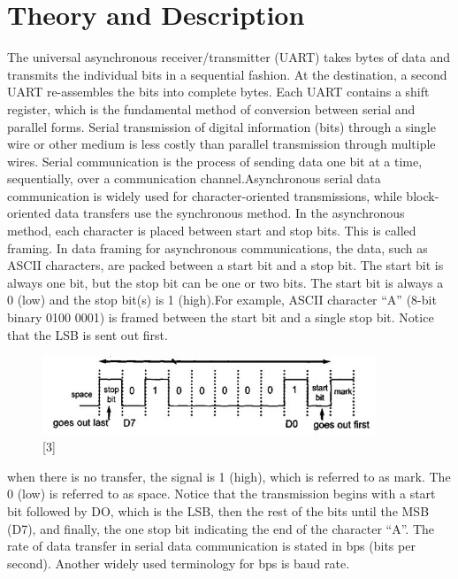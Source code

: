 \documentclass[11pt,a4paper]{article}
\begin{document}
	\section{Theory and Description}
	The universal asynchronous receiver/transmitter (UART) takes bytes of data and transmits the individual bits in a sequential fashion. At the destination, a second UART re-assembles the bits into complete bytes. Each UART contains a shift register, which is the fundamental method of conversion between serial and parallel forms. Serial transmission of digital information (bits) through a single wire or other medium is less costly than parallel transmission through multiple wires.
	 Serial communication is the process of sending data one bit at a time, sequentially, over a communication channel.Asynchronous serial data communication is widely used for character-oriented transmissions, while block-oriented data transfers use the synchronous method. In the asynchronous method, each character is placed between start and stop bits. This is called framing. In data framing for asynchronous communications, the data, such as ASCII characters, are packed between a start bit and a stop bit. The start bit is always one bit, but the stop bit can be one or two bits. The start bit is always a 0 (low) and the stop bit(s) is 1 (high).For example, ASCII character “A” (8-bit binary 0100 0001) is framed between the start bit and a single stop bit. Notice that the LSB is sent out first.
	 \begin{figure}[h!]
	 	\includegraphics[width=10cm]{Asy_serial.JPG}
	 	\centering
	 	\caption{[3]}
	 \end{figure}
	 when there is no transfer, the signal is 1 (high), which is referred to as mark. The 0 (low) is referred to as space. Notice that the transmission begins with a start bit followed by DO, which is the LSB, then the rest of the bits until the MSB (D7), and finally, the one stop bit indicating the end of the character “A”.
	 The rate of data transfer in serial data communication is stated in bps (bits per second). Another widely used terminology for bps is baud rate.
\end{document}
